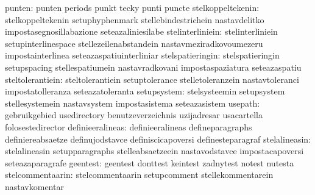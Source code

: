                           punten: punten                           periods
                                  punkt                            tecky
                                  punti                            puncte
               stelkoppeltekenin: stelkoppeltekenin                setuphyphenmark
                                  stellebindestrichein             nastavdelitko
                                  impostasegnosillabazione         seteazaliniesilabe %
                stelinterliniein: stelinterliniein                 setupinterlinespace
                                  stellezeilenabstandein           nastavmeziradkovoumezeru
                                  impostainterlinea                seteazaspatiuinterliniar
                stelspatieringin: stelspatieringin                 setupspacing
                                  stellespatiumein                 nastavradkovani
                                  impostaspaziatura                seteazaspatiu
                steltolerantiein: steltolerantiein                 setuptolerance
                                  stelletoleranzein                nastavtoleranci
                                  impostatolleranza                seteazatoleranta
                     setupsystem: stelsysteemin                    setupsystem
                                  stellesystemein                  nastavsystem
                                  impostasistema                   seteazasistem
                         usepath: gebruikgebied                    usedirectory
                                  benutzeverzeichnis               uzijadresar %
                                  usacartella                      folosestedirector %
                definieeralineas: definieeralineas                 defineparagraphs
                                  definiereabsaetze                definujodstavce
                                  definiscicapoversi               definesteparagraf
                   stelalineasin: stelalineasin                    setupparagraphs
                                  stelleabsaetzeein                nastavodstavce
                                  impostacapoversi                 seteazaparagrafe
                        geentest: geentest                         donttest
                                  keintest                         zadnytest
                                  notest                           nutesta
                stelcommentaarin: stelcommentaarin                 setupcomment
                                  stellekommentarein               nastavkomentar
